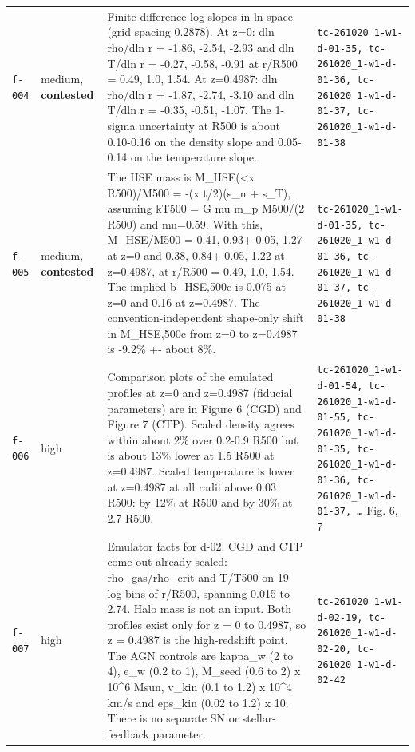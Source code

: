 \documentclass[11pt,a4paper]{article}
\begin{document}
\begin{longtable}{@{}p{}p{}p{}p{}@{}}
\texttt{f-004} & medium, \textbf{contested} & Finite-difference log slopes in ln-space (grid spacing 0.2878). At z=0: dln rho/dln r = -1.86, -2.54, -2.93 and dln T/dln r = -0.27, -0.58, -0.91 at r/R500 = 0.49, 1.0, 1.54. At z=0.4987: dln rho/dln r = -1.87, -2.74, -3.10 and dln T/dln r = -0.35, -0.51, -1.07. The 1-sigma uncertainty at R500 is about 0.10-0.16 on the density slope and 0.05-0.14 on the temperature slope. & \texttt{tc-261020\_\allowbreak{}1-w1-d-01-35,\allowbreak{} tc-261020\_\allowbreak{}1-w1-d-01-36,\allowbreak{} tc-261020\_\allowbreak{}1-w1-d-01-37,\allowbreak{} tc-261020\_\allowbreak{}1-w1-d-01-38} \\
\texttt{f-005} & medium, \textbf{contested} & The HSE mass is M\_HSE(\textless{}x R500)/M500 = -(x t/2)(s\_n + s\_T), assuming kT500 = G mu m\_p M500/(2 R500) and mu=0.59. With this, M\_HSE/M500 = 0.41, 0.93+-0.05, 1.27 at z=0 and 0.38, 0.84+-0.05, 1.22 at z=0.4987, at r/R500 = 0.49, 1.0, 1.54. The implied b\_HSE,500c is 0.075 at z=0 and 0.16 at z=0.4987. The convention-independent shape-only shift in M\_HSE,500c from z=0 to z=0.4987 is -9.2\% +- about 8\%. & \texttt{tc-261020\_\allowbreak{}1-w1-d-01-35,\allowbreak{} tc-261020\_\allowbreak{}1-w1-d-01-36,\allowbreak{} tc-261020\_\allowbreak{}1-w1-d-01-37,\allowbreak{} tc-261020\_\allowbreak{}1-w1-d-01-38} \\
\texttt{f-006} & high & Comparison plots of the emulated profiles at z=0 and z=0.4987 (fiducial parameters) are in Figure 6 (CGD) and Figure 7 (CTP). Scaled density agrees within about 2\% over 0.2-0.9 R500 but is about 13\% lower at 1.5 R500 at z=0.4987. Scaled temperature is lower at z=0.4987 at all radii above 0.03 R500: by 12\% at R500 and by 30\% at 2.7 R500. & \texttt{tc-261020\_\allowbreak{}1-w1-d-01-54,\allowbreak{} tc-261020\_\allowbreak{}1-w1-d-01-55,\allowbreak{} tc-261020\_\allowbreak{}1-w1-d-01-35,\allowbreak{} tc-261020\_\allowbreak{}1-w1-d-01-36,\allowbreak{} tc-261020\_\allowbreak{}1-w1-d-01-37,\allowbreak{} \ldots{}\allowbreak{}} Fig. 6, 7 \\
\texttt{f-007} & high & Emulator facts for d-02. CGD and CTP come out already scaled: rho\_gas/rho\_crit and T/T500 on 19 log bins of r/R500, spanning 0.015 to 2.74. Halo mass is not an input. Both profiles exist only for z = 0 to 0.4987, so z = 0.4987 is the high-redshift point. The AGN controls are kappa\_w (2 to 4), e\_w (0.2 to 1), M\_seed (0.6 to 2) x 10\textasciicircum{}6 Msun, v\_kin (0.1 to 1.2) x 10\textasciicircum{}4 km/s and eps\_kin (0.02 to 1.2) x 10. There is no separate SN or stellar-feedback parameter. & \texttt{tc-261020\_\allowbreak{}1-w1-d-02-19,\allowbreak{} tc-261020\_\allowbreak{}1-w1-d-02-20,\allowbreak{} tc-261020\_\allowbreak{}1-w1-d-02-42} \\

\end{longtable}
\end{document}
